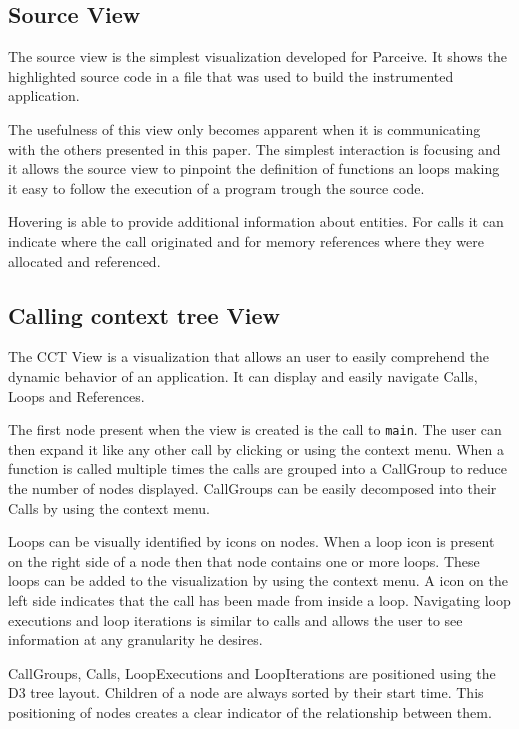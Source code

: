 \documentclass[conference]{IEEEtran}
\begin{document}
\subsection{Source View}

The source view is the simplest visualization developed for Parceive. It shows the highlighted source code in a file that was used to build the instrumented application.

The usefulness of this view only becomes apparent when it is communicating with the others presented in this paper. The simplest interaction is focusing and it allows the source view to pinpoint the definition of functions an loops making it easy to follow the execution of a program trough the source code.

Hovering is able to provide additional information about entities. For calls it can indicate where the call originated and for memory references where they were allocated and referenced.

\subsection{Calling context tree View}

The CCT View is a visualization that allows an user to easily comprehend the dynamic behavior of an application. It can display and easily navigate Calls, Loops and References.

The first node present when the view is created is the call to \texttt{main}. The user can then expand it like any other call by clicking or using the context menu. When a function is called multiple times the calls are grouped into a CallGroup to reduce the number of nodes displayed. CallGroups can be easily decomposed into their Calls by using the context menu.

Loops can be visually identified by icons on nodes. When a loop icon is present on the right side of a node then that node contains one or more loops. These loops can be added to the visualization by using the context menu. A icon on the left side indicates that the call has been made from inside a loop. Navigating loop executions and loop iterations is similar to calls and allows the user to see information at any granularity he desires.

CallGroups, Calls, LoopExecutions and LoopIterations are positioned using the D3 tree layout. Children of a node are always sorted by their start time. This positioning of nodes creates a clear indicator of the relationship between them.
\end{document}

